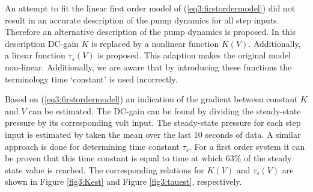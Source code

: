 An attempt to fit the linear first order model of (\ref{eq3:firstordermodel}) did not result in an accurate description of the pump dynamics for all step inputs. Therefore an alternative description of the pump dynamics is proposed. In this description DC-gain $K$ is replaced by a nonlinear function $K(V)$. Additionally, a linear function $\tau_s(V)$ is proposed. This adaption makes the original model non-linear. Additionally, we are aware that by introducing these functions the terminology time `constant' is used incorrectly.


Based on (\ref{eq3:firstordermodel}) an indication of the gradient between constant $K$ and $V$ can be estimated. The DC-gain can be found by dividing the steady-state pressure by its corresponding volt input. The steady-state pressure for each step input is estimated by taken the mean over the last 10 seconds of data. A similar approach is done for determining time constant $\tau_s$. For a first order system it can be proven that this time constant is equal to time at which 63\% of the steady state value is reached. The corresponding relations for $K(V)$ and $\tau_s(V)$ are shown in Figure \ref{fig3:Kest} and Figure \ref{fig3:tauest}, respectively.
\newpage

